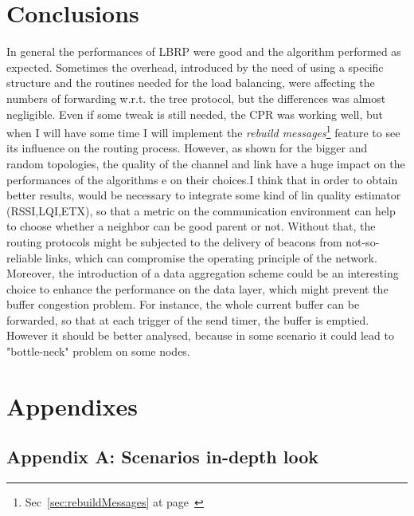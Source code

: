 \documentclass{article}
\begin{document}
\section{Conclusions}
In general the performances of LBRP were good and the algorithm performed as expected. Sometimes the overhead, introduced by the need of using a specific structure and the routines needed for the load balancing, were affecting the numbers of forwarding w.r.t. the tree protocol, but the differences was almost negligible. Even if some tweak is still needed, the CPR was working well, but when I will have some time I will implement the \textit{rebuild messages}\footnote{Sec~\ref{sec:rebuildMessages} at page~\pageref{sec:rebuildMessages}} feature to see its influence on the routing process.
However, as shown for the bigger and random topologies, the quality of the channel and link have a huge impact on the performances of the algorithms e on their choices.I think that in order to obtain better results, would be necessary to integrate some kind of lin quality estimator (RSSI,LQI,ETX), so that a metric on the communication environment can help to choose whether a neighbor can be good parent or not. Without that, the routing protocols might be subjected to the delivery of beacons from not-so-reliable links, which can compromise the operating principle of the network. Moreover, the introduction of a data aggregation scheme could be an interesting choice to enhance the performance on the data layer, which might prevent the buffer congestion problem. For instance, the whole current buffer can be forwarded, so that at each trigger of the send timer, the buffer is emptied. However it should be better analysed, because in some scenario it could lead to "bottle-neck" problem on some nodes.
\clearpage
\section{Appendixes}
\subsection{Appendix A: Scenarios in-depth look}
\end{document}
